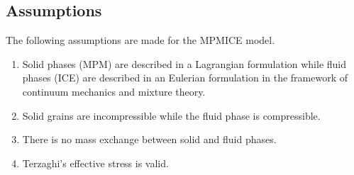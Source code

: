 \documentclass[preprint,12pt]{elsarticle}
\begin{document}
\subsection{\textsf{Assumptions}}
The following assumptions are made for the MPMICE model.
\begin{enumerate}
\item Solid phases (MPM) are described in a Lagrangian formulation while fluid phases (ICE) are described in an Eulerian formulation in the framework of continuum mechanics and mixture theory.
\item Solid grains are incompressible while the fluid phase is compressible.
\item There is no mass exchange between solid and fluid phases.
\item Terzaghi's effective stress is valid. 
\end{enumerate}
%
%
\end{document}
